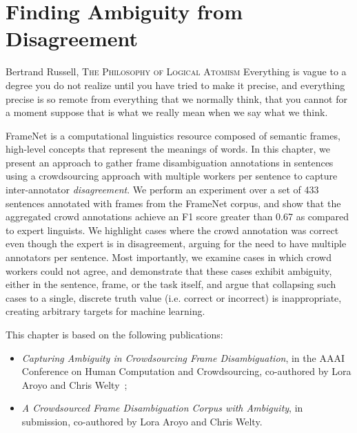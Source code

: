 \chapter{Finding Ambiguity from Disagreement}
\label{chap:frames}



\begin{chapquote}{Bertrand Russell, \textsc{The Philosophy of Logical Atomism}}
Everything is vague to a degree you do not realize until you have tried to make it precise, and everything precise is so remote from everything that we normally think, that you cannot for a moment suppose that is what we really mean when we say what we think.
\end{chapquote}


FrameNet is a computational linguistics resource composed of semantic frames, high-level concepts that represent the meanings of words. In this chapter, we present an approach to gather frame disambiguation annotations in sentences using a crowdsourcing approach with multiple workers per sentence to capture inter-annotator \emph{disagreement}. We perform an experiment over a set of 433 sentences annotated with frames from the FrameNet corpus, and show that the aggregated crowd annotations achieve an F1 score greater than 0.67 as compared to expert linguists. We highlight cases where the crowd annotation was correct even though the expert is in disagreement, arguing for the need to have multiple annotators per sentence.  Most importantly, we examine cases in which crowd workers could not agree, and demonstrate that these cases exhibit ambiguity, either in the sentence, frame, or the task itself, and argue that collapsing such cases to a single, discrete truth value (i.e. correct or incorrect) is inappropriate, creating arbitrary targets for machine learning.

This chapter is based on the following publications:
\begin{itemize}
    \item \textit{Capturing Ambiguity in Crowdsourcing Frame Disambiguation}, in the AAAI Conference on Human Computation and Crowdsourcing, co-authored by Lora Aroyo and Chris Welty~\cite{DBLP:conf/hcomp/DumitracheAW18};
    
    \item \textit{A Crowdsourced Frame Disambiguation Corpus with Ambiguity}, in submission, co-authored by Lora Aroyo and Chris Welty.
\end{itemize}

